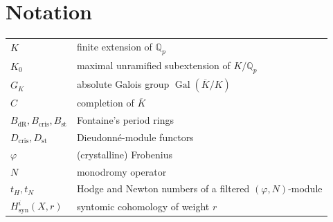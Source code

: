 \documentclass[10pt]{amsbook}
\theoremstyle{definition}
\theoremstyle{remark}
\DeclareMathOperator{\Gal}{Gal}
\newcommand{\Qp}{\mathbb{Q}_p}
\begin{document}
\backmatter

\chapter*{Notation}

\begin{tabular}{@{}ll@{}}
$K$ & finite extension of $\Qp$ \\
$K_0$ & maximal unramified subextension of $K/\Qp$ \\
$G_K$ & absolute Galois group $\Gal(\overline K/K)$ \\
$C$ & completion of $\overline K$ \\
$B_{\mathrm{dR}}, B_{\mathrm{cris}}, B_{\mathrm{st}}$ & Fontaine's period rings \\
$D_{\mathrm{cris}}, D_{\mathrm{st}}$ & Dieudonn\'e-module functors \\
$\varphi$ & (crystalline) Frobenius \\
$N$ & monodromy operator \\
$t_H, t_N$ & Hodge and Newton numbers of a filtered $(\varphi,N)$-module \\
$H^i_{\mathrm{syn}}(X,r)$ & syntomic cohomology of weight $r$ \\
\end{tabular}
\end{document}
